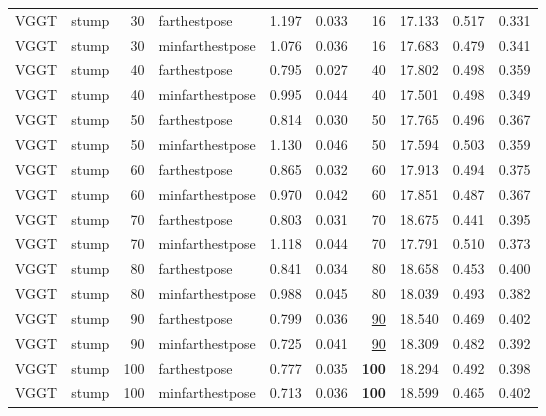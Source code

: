 \begin{table}[H]
\begin{tabular}{llrlrrrrrr}
VGGT & stump & 30 & farthestpose & 1.197 & 0.033 & 16 & 17.133 & 0.517 & 0.331 \\
VGGT & stump & 30 & minfarthestpose & 1.076 & 0.036 & 16 & 17.683 & 0.479 & 0.341 \\
VGGT & stump & 40 & farthestpose & 0.795 & 0.027 & 40 & 17.802 & 0.498 & 0.359 \\
VGGT & stump & 40 & minfarthestpose & 0.995 & 0.044 & 40 & 17.501 & 0.498 & 0.349 \\
VGGT & stump & 50 & farthestpose & 0.814 & 0.030 & 50 & 17.765 & 0.496 & 0.367 \\
VGGT & stump & 50 & minfarthestpose & 1.130 & 0.046 & 50 & 17.594 & 0.503 & 0.359 \\
VGGT & stump & 60 & farthestpose & 0.865 & 0.032 & 60 & 17.913 & 0.494 & 0.375 \\
VGGT & stump & 60 & minfarthestpose & 0.970 & 0.042 & 60 & 17.851 & 0.487 & 0.367 \\
VGGT & stump & 70 & farthestpose & 0.803 & 0.031 & 70 & 18.675 & 0.441 & 0.395 \\
VGGT & stump & 70 & minfarthestpose & 1.118 & 0.044 & 70 & 17.791 & 0.510 & 0.373 \\
VGGT & stump & 80 & farthestpose & 0.841 & 0.034 & 80 & 18.658 & 0.453 & 0.400 \\
VGGT & stump & 80 & minfarthestpose & 0.988 & 0.045 & 80 & 18.039 & 0.493 & 0.382 \\
VGGT & stump & 90 & farthestpose & 0.799 & 0.036 & \underline{90} & 18.540 & 0.469 & 0.402 \\
VGGT & stump & 90 & minfarthestpose & 0.725 & 0.041 & \underline{90} & 18.309 & 0.482 & 0.392 \\
VGGT & stump & 100 & farthestpose & 0.777 & 0.035 & \textbf{100} & 18.294 & 0.492 & 0.398 \\
VGGT & stump & 100 & minfarthestpose & 0.713 & 0.036 & \textbf{100} & 18.599 & 0.465 & 0.402 \\
\bottomrule
\end{tabular}
\end{table}